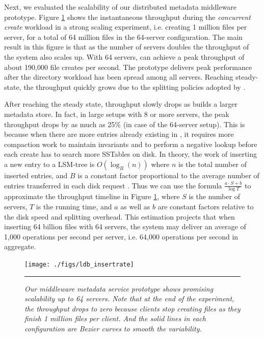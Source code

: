 Next, we evaluated the scalability of our distributed metadata middleware
prototype.
Figure \ref{graph:ldb-scaling} shows the instantaneous throughput during the
\textit{concurrent create} workload in a strong scaling experiment, i.e.
creating 1 million files per server, for a total of 64 million files in the
64-server configuration.
The main result in this figure is that as the number of servers doubles the
throughput of the system also scales up. With 64 servers, \giga{} can achieve a
peak throughput of about 190,000 file creates per second. The prototype delivers
peak performance after the directory workload has been spread among all
servers.
Reaching steady-state, the throughput quickly grows due to the splitting
policies adopted by \giga{}.

After reaching the steady state, throughput slowly drops as \ldb builds a
larger metadata store.
In fact, in large setups with 8 or more servers,
the peak throughput drops by as much as 25\% (in case of the 64-server setup).
This is because when there are more entries already existing in \ldb,
it requires more compaction work to maintain \ldb invariants and to perform a
negative lookup before each create has to search more SSTables on disk.
In theory, the work of inserting a new entry to a LSM-tree is $O(\log_{B}(n))$
where $n$ is the total number of inserted entries, and $B$ is a constant factor
proportional to the average number of entries transferred in each disk request
\cite{Bender2007}.
Thus we can use the formula $\frac{a\cdot S+b}{\log{T}}$ to
approximate the throughput timeline in Figure \ref{graph:ldb-scaling},
where $S$ is the number of servers, $T$ is the running time, and $a$ as well as $b$
are constant factors relative to the disk speed and splitting overhead.
This estimation projects that when inserting 64 billion files with 64 servers,
the system may deliver an average of 1,000 operations per second per server,
i.e. 64,000 operations per second in aggregate.

\begin{figure}[t]  %
\centerline{\texttt{[image: ./figs/ldb\_insertrate]}}
\vspace{10pt}
\caption{\normalsize
\textit{Our middleware metadata service prototype shows promising scalability
up to 64 servers.
Note that at the end of the experiment,
the throughput drops to zero
because clients stop creating files as they finish 1 million files per client.
And the solid lines in each configuration are Bezier
curves to smooth the variability.}
}
\vspace{10pt}
\hrule
\label{graph:ldb-scaling}
\end{figure}       %

